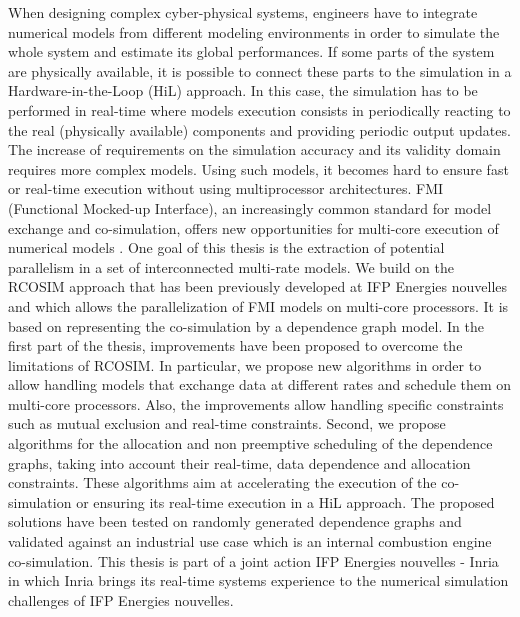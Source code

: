 When designing complex cyber-physical systems, engineers have to integrate numerical models
from different
modeling environments in order to simulate the whole system and estimate its global
performances. If some parts of the system are physically available, it is possible to connect these
parts to the simulation in a Hardware-in-the-Loop (HiL) approach. In this case, the
simulation has to be performed in real-time where models execution consists in periodically
reacting to the real (physically available) components and providing periodic output updates. The
increase of requirements on the simulation accuracy and its validity domain requires more
complex models. Using such models, it becomes hard to ensure fast or real-time execution without using
multiprocessor architectures. FMI (Functional Mocked-up Interface), an increasingly common
standard for model exchange and co-simulation, offers
new opportunities for multi-core execution
of numerical models%
. One goal of this thesis is the extraction of potential parallelism in a set of interconnected multi-rate models. We build on the RCOSIM approach that has been previously developed at IFP Energies nouvelles and which allows the parallelization of FMI models on multi-core processors. It is based on representing the co-simulation by a dependence graph model. In the first part of the thesis, improvements have been proposed to overcome the limitations of RCOSIM. In particular, we propose new algorithms in order to allow
handling models that exchange data at different
rates and schedule them on multi-core processors. Also, the improvements allow handling specific constraints such as mutual exclusion and real-time constraints. 
Second, we propose algorithms for the allocation and non preemptive scheduling of the dependence graphs, taking %
into account their real-time, data dependence and allocation constraints. These algorithms aim at accelerating the execution of the co-simulation or ensuring its real-time execution in a HiL approach.
The proposed solutions have been tested on randomly generated dependence graphs and validated against an industrial use case which is an internal combustion engine co-simulation.
This thesis is part of a joint action IFP Energies nouvelles - Inria in which Inria brings its real-time systems experience to the numerical simulation challenges of IFP Energies nouvelles.